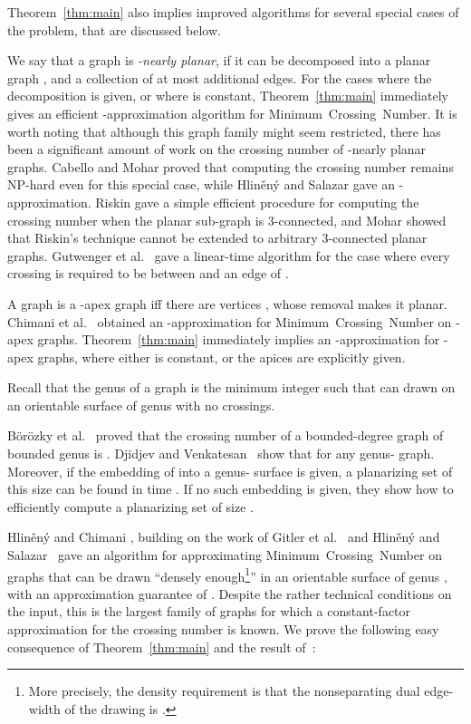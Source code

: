 \documentclass[twoside,leqno,twocolumn]{article}
\newcommand{\MCN}{\mbox{\sf Minimum Crossing Number}\xspace}
\begin{document}
Theorem~\ref{thm:main} also implies improved algorithms for several special cases of the problem, that are discussed below.

 We say that a graph  is \emph{-nearly planar}, if it can be decomposed into a planar graph , and a collection of at most  additional edges. For the cases where the decomposition is given, or where  is constant, Theorem~\ref{thm:main} immediately gives an efficient -approximation algorithm for \MCN.
It is worth noting that although this graph family might seem restricted, there has been a significant amount of work on the crossing number of -nearly planar graphs.
Cabello and Mohar \cite{cabello_edge} proved that computing the crossing number remains NP-hard even for this special case, while
Hlin\v{e}n\'{y} and Salazar \cite{HlinenyS06} gave an -approximation.
Riskin \cite{riskin_edge} gave a simple efficient procedure for computing the crossing number when the planar sub-graph  is 3-connected, and
Mohar \cite{Mohar_almost} showed that Riskin's technique cannot be extended to arbitrary 3-connected planar graphs.
Gutwenger et al.~\cite{GutwengerMW05} gave a linear-time algorithm for the case where every crossing is required to be between  and an edge of .


A graph  is a -apex graph iff there are  vertices , whose removal makes it planar. Chimani et al.~\cite{crossing_apex} obtained an -approximation for \MCN on -apex graphs. Theorem~\ref{thm:main} immediately implies an -approximation for -apex graphs, where either  is constant, or  the  apices are explicitly given.



Recall that the genus of a graph  is the minimum integer  such that  can drawn on an orientable surface of genus  with no crossings.


B\"{o}r\"{o}zky et al.~\cite{BorozkyPT06} proved that 
the crossing number of a bounded-degree graph of bounded genus is .
Djidjev and Venkatesan~\cite{genus-planarization} show that  for any genus- graph. Moreover, if the embedding of  into a genus- surface is given, a planarizing set of this size can be found in time .
If no such embedding is given, they show how to efficiently compute a planarizing set of size .

Hlin\v{e}n\'{y} and Chimani \cite{crossing_genus}, building on the work of Gitler et al.~\cite{crossing_projective} and Hlin\v{e}n\'{y} and Salazar~\cite{crossing_torus}  gave an algorithm for approximating \MCN on graphs that can be drawn ``densely enough\footnote{More precisely, the density requirement is that the nonseparating dual edge-width of the drawing is .}'' in an orientable surface of genus ,
with an approximation guarantee of . \iffull
Despite the rather technical conditions on the input, this is the largest family of graphs for which a constant-factor approximation for the crossing number is known.\fi
We prove the following easy consequence of Theorem~\ref{thm:main} and the result of~\cite{crossing_genus}:
\end{document}
